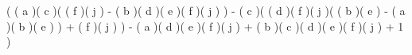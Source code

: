 ( {{{\cos( a )}{\sin( c )}( {{{\sin( f )}{\cos( j )}} - {{\sin( b )}{\cos( d )}{\sin( e )}{\cos( f )}{\sin( j )}}} )} - {{\cos( c )}( {{{\cos( d )}{\sin( f )}{\sin( j )}( {{{\sin( b )}{\sin( e )}} - {{\cos( a )}{\cos( b )}{\cos( e )}}} )} + {{\cos( f )}{\cos( j )}}} )} - {{\sin( a )}{\sin( d )}{\cos( e )}{\sin( f )}{\sin( j )}} + {{\cos( b )}{\sin( c )}{\cos( d )}{\cos( e )}{\cos( f )}{\sin( j )}} + 1} )
